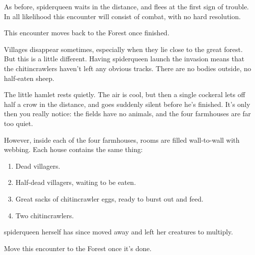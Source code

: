 \begin{multicols}{2}
As before, \gls{spiderqueen} waits in the distance, and flees at the first sign of trouble.  In all likelihood this encounter will consist of combat, with no hard resolution.

This encounter moves back to the Forest once finished.


Villages disappear sometimes, especially when they lie close to the great forest.  But this is a little different.  Having \gls{spiderqueen} launch the invasion means that the chitincrawlers haven't left any obvious tracks.  There are no bodies outside, no half-eaten sheep.

\begin{boxtext}
	The little hamlet rests quietly.  The air is cool, but then a single cockeral lets off half a crow in the distance, and goes suddenly silent before he's finished.  It's only then you really notice: the fields have no animals, and the four farmhouses are far too quiet.
\end{boxtext}

However, inside each of the four farmhouses, rooms are filled wall-to-wall with webbing.  Each house contains the same thing:

\begin{enumerate}

	\item{Dead villagers.}
	\item{Half-dead villagers, waiting to be eaten.}
	\item{Great sacks of chitincrawler eggs, ready to burst out and feed.}
	\item{Two chitincrawlers.}
\end{enumerate}

\Gls{spiderqueen} herself has since moved away and left her creatures to multiply.

Move this encounter to the Forest once it's done.

\vfill\null\columnbreak

\begin{figure*}[t]

	\label{ruined_village_map}\label{ruined_village_map}

\end{figure*}


\chitincrawler


\end{multicols}
